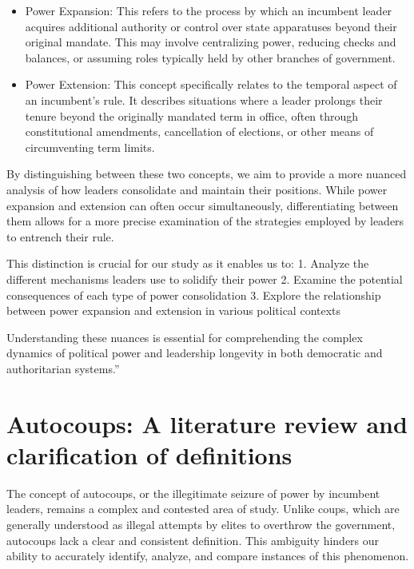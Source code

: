 \documentclass[
  12pt,
]{report}
\begin{document}
\begin{itemize}
\item
  Power Expansion: This refers to the process by which an incumbent
  leader acquires additional authority or control over state apparatuses
  beyond their original mandate. This may involve centralizing power,
  reducing checks and balances, or assuming roles typically held by
  other branches of government.
\item
  Power Extension: This concept specifically relates to the temporal
  aspect of an incumbent's rule. It describes situations where a leader
  prolongs their tenure beyond the originally mandated term in office,
  often through constitutional amendments, cancellation of elections, or
  other means of circumventing term limits.
\end{itemize}

By distinguishing between these two concepts, we aim to provide a more
nuanced analysis of how leaders consolidate and maintain their
positions. While power expansion and extension can often occur
simultaneously, differentiating between them allows for a more precise
examination of the strategies employed by leaders to entrench their
rule.

This distinction is crucial for our study as it enables us to: 1.
Analyze the different mechanisms leaders use to solidify their power 2.
Examine the potential consequences of each type of power consolidation
3. Explore the relationship between power expansion and extension in
various political contexts

Understanding these nuances is essential for comprehending the complex
dynamics of political power and leadership longevity in both democratic
and authoritarian systems.''

\section{Autocoups: A literature review and clarification of
definitions}\label{autocoups-a-literature-review-and-clarification-of-definitions}

The concept of autocoups, or the illegitimate seizure of power by
incumbent leaders, remains a complex and contested area of study. Unlike
coups, which are generally understood as illegal attempts by elites to
overthrow the government, autocoups lack a clear and consistent
definition. This ambiguity hinders our ability to accurately identify,
analyze, and compare instances of this phenomenon.
\end{document}
